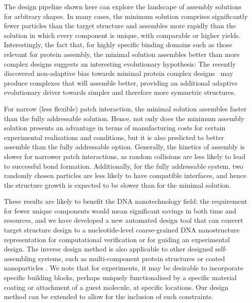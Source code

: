 The design pipeline shown here can explore the landscape of assembly solutions for arbitrary shapes. In many cases, the minimum solution comprises significantly fewer particles than the target structure and assembles more rapidly than the solution in which every component is unique, with comparable or higher yields. Interestingly, the fact that, for highly specific binding domains such as those relevant for protein assembly, the minimal solution assembles better than more complex designs suggests an interesting evolutionary hypothesis:  The recently discovered non-adaptive bias towards minimal protein complex designs~\cite{johnston2021} may produce complexes that will assemble better, providing an additional adaptive evolutionary driver towards simpler and therefore more symmetric structures.

For narrow (less flexible) patch interaction, the minimal solution assembles faster than the fully addressable solution. Hence, not only does the minimum assembly solution presents an advantage in terms of manufacturing costs for certain experimental realisations and conditions, but it is also predicted to better assemble than the fully addressable option. Generally, the kinetics of assembly is slower for narrower patch interactions, as random collisions are less likely to lead to successful bond formation. Additionally, for the fully addressable system, two randomly chosen particles are less likely to have compatible interfaces, and hence the structure growth is expected to be slower than for the minimal solution.

These results are likely to benefit the DNA nanotechnology field: the requirement for fewer unique components would mean significant savings in both time and resources, and we have developed a new automated design tool that can convert target structure design to a nucleotide-level coarse-grained DNA nanostructure representation for computational verification or for guiding an experimental design. The inverse design method is also applicable to other designed self-assembling systems, such as multi-component protein structures or coated nanoparticles \cite{zhu2021protein,xiong2020three}. We note that for experiments, it may be desirable to incorporate specific building blocks, perhaps uniquely functionalised by a specific material coating or attachment of a guest molecule, at specific locations. Our design method can be extended to allow for the inclusion of such constraints.  

